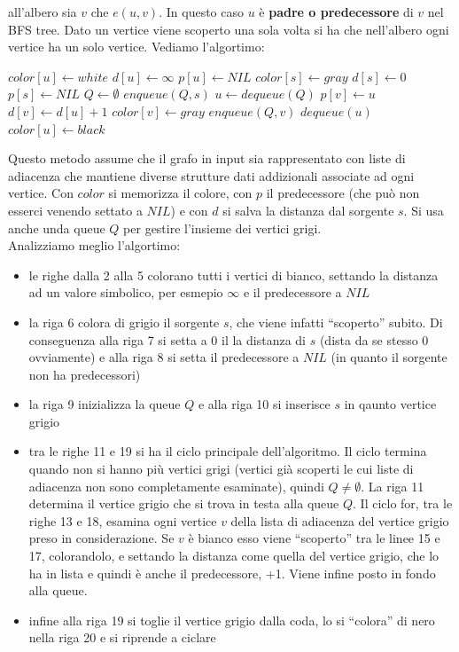 \documentclass[a4paper,12pt, oneside]{book}
\begin{document}
all'albero sia $v$ che $e(u,v)$. In questo caso $u$ è \textbf{padre o
  predecessore} di $v$ nel BFS tree. Dato un vertice viene scoperto
una sola volta si ha che nell'albero ogni vertice ha un solo vertice.
\newpage
Vediamo l'algortimo:
\begin{shaded}
  \begin{algorithmic}[1]
    \State $color[u]\gets white$
    \State $d[u]\gets \infty$
    \State $p[u]\gets NIL$
    \EndFor
    \State $color[s]\gets gray$
    \State $d[s]\gets 0$
    \State $p[s]\gets NIL$
    \State $Q\gets \emptyset$
    \State $enqueue(Q,s)$
    \State $u\gets dequeue(Q)$
    \State $p[v]\gets u$
    \State $d[v]\gets d[u]+1$
    \State $color[v]\gets gray$
    \State $enqueue(Q,v)$
    \EndIf
    \EndFor
    \State $dequeue(u)$
    \State $color[u]\gets black$ 
    \EndWhile
    \EndFunction
  \end{algorithmic}
\end{shaded}
Questo metodo assume che il grafo in input sia rappresentato con liste
di adiacenza che mantiene diverse strutture dati addizionali associate
ad ogni vertice. Con $color$ si memorizza il colore, con $p$ il
predecessore (che può non esserci venendo settato a $NIL$) e con $d$
si salva la distanza dal sorgente $s$. Si usa anche unda queue $Q$ per
gestire l'insieme dei vertici grigi.\\
Analizziamo meglio l'algortimo:
\begin{itemize}
  \item le righe dalla 2 alla 5 colorano tutti i vertici di bianco,
  settando la distanza ad un valore simbolico, per esmepio $\infty$ e
  il predecessore a $NIL$
  \item la riga 6 colora di grigio il sorgente $s$, che viene infatti
  ``scoperto'' subito. Di conseguenza alla riga 7 si setta a 0 il
  la distanza di $s$ (dista da se stesso 0 ovviamente) e alla riga 8
  si setta il predecessore a $NIL$ (in quanto il sorgente non ha
  predecessori)
  \item la riga 9 inizializza la queue $Q$ e alla riga 10 si inserisce
  $s$ in qaunto vertice grigio
  \item tra le righe 11 e 19 si ha il ciclo principale
  dell'algoritmo. Il ciclo termina quando non si hanno più vertici
  grigi (vertici già scoperti le cui liste di adiacenza non sono
  completamente esaminate), quindi $Q\neq \emptyset$. La riga 11
  determina il vertice grigio che   si trova in testa alla queue
  $Q$. Il ciclo for, tra le righe 13 e   18, esamina ogni vertice $v$
  della lista di adiacenza del vertice grigio   preso in
  considerazione. Se $v$ è bianco esso viene ``scoperto'' tra   le
  linee 15 e 17, colorandolo, e settando la distanza come quella   del
  vertice grigio, che lo ha in lista e quindi è anche il
  predecessore, +1. Viene infine posto in fondo alla queue.
  \item infine alla riga 19 si toglie il vertice grigio dalla coda, lo
  si ``colora'' di nero nella riga 20 e si riprende a ciclare
\end{itemize}
\end{document}
